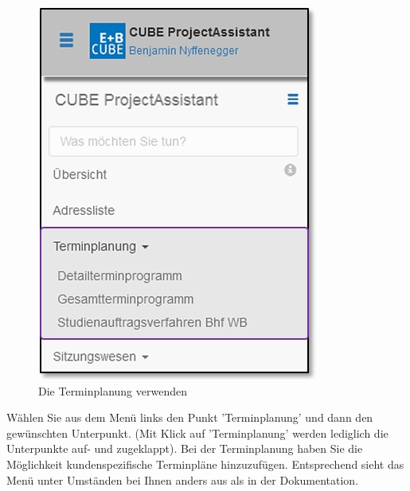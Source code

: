 \begin{figure}   %
  \vspace{-35pt}      %
  \begin{center}
    \includegraphics[width=1\linewidth]{../chapters/04_Terminplanung/pictures/4-1_Menu_Terminplanung.jpg}
  \end{center}
  \vspace{-20pt}
  \caption{Die Terminplanung verwenden}
  \vspace{-10pt}
\end{figure}

Wählen Sie aus dem Menü links den Punkt 'Terminplanung' und dann den gewünschten Unterpunkt. (Mit Klick auf 'Terminplanung' werden lediglich die Unterpunkte auf- und zugeklappt). Bei der Terminplanung haben Sie die Möglichkeit kundenspezifische Terminpläne hinzuzufügen. Entsprechend sieht das Menü unter Umständen bei Ihnen anders aus als in der Dokumentation.

